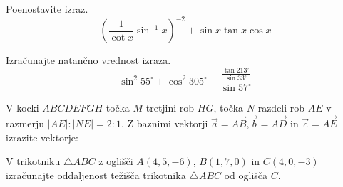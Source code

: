 \documentclass[addpoints]{exam}
\begin{document}
\begin{questions}


    \question[4]
    Poenostavite izraz. 
    $$ \left(\dfrac{1}{\cot x}\sin^{-1}x\right)^{-2}+\sin x\tan x\cos x $$

    \begin{solution}[6.5cm]
       
    \end{solution}



    \question[4]
    Izračunajte natančno vrednost izraza. 
    $$ \sin^2 55^\circ + \cos^2 305^\circ - \dfrac{\frac{\tan 213^\circ}{\sin 33^\circ}}{\sin 57^\circ} $$

    \begin{solution}[6cm]
       
    \end{solution}


\newpage

    \question
    V kocki $ABCDEFGH$ točka $M$ tretjini rob $HG$, točka $N$ razdeli rob $AE$ v razmerju $|AE|:|NE|=2:1$.
    Z baznimi vektorji $\overrightarrow{a}=\overrightarrow{AB}, \overrightarrow{b}=\overrightarrow{AD}$ in $\overrightarrow{c}=\overrightarrow{AE}$ izrazite vektorje: 

    \begin{solution}[5cm]

    \end{solution}

    

    

    \question[4]
    V trikotniku $\triangle ABC$ z oglišči $A(4,5,-6)$, $B(1,7,0)$ in $C(4,0,-3)$ izračunajte oddaljenost težišča trikotnika $\triangle ABC$ od oglišča $C$.


\end{questions}
\end{document}
